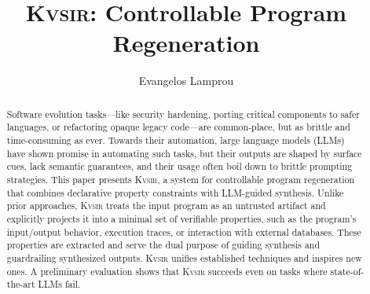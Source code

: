 \documentclass[sigplan,review,anonymous,10pt]{acmart}
\newcommand{\sys}{{\scshape Kv{\textalpha}sir}\xspace}
\begin{document}
\title{\sys: Controllable Program Regeneration}
\author{Evangelos Lamprou}



\begin{abstract}
  Software evolution tasks---like security hardening, porting critical components to safer 
  languages, or refactoring opaque legacy code---are common-place, but as brittle and time-consuming as ever.
  Towards their automation, large language models (LLMs) have shown promise in automating such tasks,
  but their outputs are shaped by surface cues, lack
  semantic guarantees, and their usage often boil down to brittle prompting strategies.
  This paper presents \sys, a system for controllable program regeneration that
  combines declarative property constraints with LLM-guided synthesis. Unlike
  prior approaches, \sys treats the input program as an untrusted artifact and
  explicitly projects it into a minimal set of verifiable properties, such as
  the program's input/output behavior, execution traces, or interaction with external databases.
  These properties are extracted and serve the dual purpose of guiding synthesis and guardrailing synthesized outputs.
  \sys unifies established techniques and inspires new ones. %
  A preliminary evaluation shows that \sys succeeds even on tasks where state-of-the-art LLMs fail.
\end{abstract}

\end{document}
